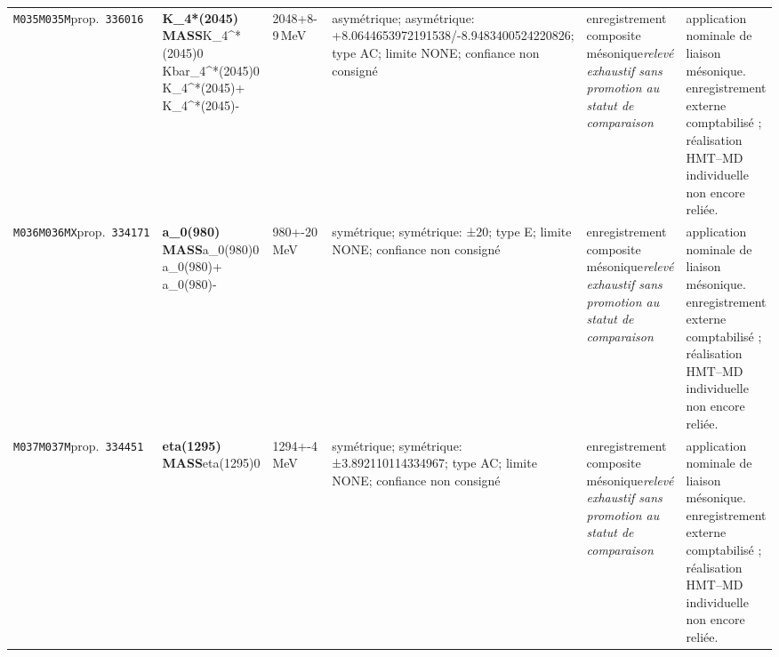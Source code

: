\begin{landscape}
\begin{longtable}{L{1.85cm}L{4.45cm}L{2.35cm}L{4.05cm}L{3.35cm}L{7.15cm}}
\texttt{M035}\newline \texttt{M035M}\newline prop.\ \texttt{336016} & \textbf{K\_\allowbreak{}4*(2045) MASS}\newline K\_\allowbreak{}4\textasciicircum{}*(2045)0 \textbar{}\allowbreak{} Kbar\_\allowbreak{}4\textasciicircum{}*(2045)0 \textbar{}\allowbreak{} K\_\allowbreak{}4\textasciicircum{}*(2045)+ \textbar{}\allowbreak{} K\_\allowbreak{}4\textasciicircum{}*(2045)- & 2048+8-9\,MeV & asymétrique; asymétrique: +8.0644653972191538/-8.9483400524220826; type AC; limite NONE; confiance non consigné & enregistrement composite mésonique\newline \emph{relevé exhaustif sans promotion au statut de comparaison} & application nominale de liaison mésonique. enregistrement externe comptabilisé ; réalisation HMT--MD individuelle non encore reliée. \\
\texttt{M036}\newline \texttt{M036MX}\newline prop.\ \texttt{334171} & \textbf{a\_\allowbreak{}0(980) MASS}\newline a\_\allowbreak{}0(980)0 \textbar{}\allowbreak{} a\_\allowbreak{}0(980)+ \textbar{}\allowbreak{} a\_\allowbreak{}0(980)- & 980+-20\,MeV & symétrique; symétrique: ±20; type E; limite NONE; confiance non consigné & enregistrement composite mésonique\newline \emph{relevé exhaustif sans promotion au statut de comparaison} & application nominale de liaison mésonique. enregistrement externe comptabilisé ; réalisation HMT--MD individuelle non encore reliée. \\
\texttt{M037}\newline \texttt{M037M}\newline prop.\ \texttt{334451} & \textbf{eta(1295) MASS}\newline eta(1295)0 & 1294+-4\,MeV & symétrique; symétrique: ±3.892110114334967; type AC; limite NONE; confiance non consigné & enregistrement composite mésonique\newline \emph{relevé exhaustif sans promotion au statut de comparaison} & application nominale de liaison mésonique. enregistrement externe comptabilisé ; réalisation HMT--MD individuelle non encore reliée. \\

\end{longtable}
\end{landscape}
